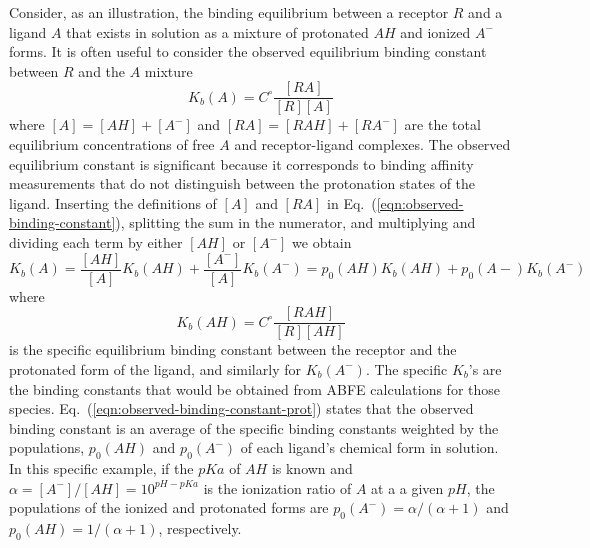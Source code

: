 \documentclass[9pt,bestpractices,pubversion]{livecoms}
\begin{document}
Consider, as an illustration, the binding equilibrium between a receptor $R$ and a ligand $A$ that exists in solution as a mixture of protonated $AH$ and ionized $A^-$ forms. It is often useful to consider the observed equilibrium binding constant between $R$ and the $A$ mixture 
\begin{equation}
  K_b(A) = C^\circ \frac{[RA]}{[R][A]}
  \label{eqn:observed-binding-constant}
\end{equation}
where $[A] = [AH] + [A^-]$ and $[RA] = [RAH] + [RA^-]$ are the total equilibrium concentrations of free $A$ and receptor-ligand complexes. The observed equilibrium constant is significant because it corresponds to binding affinity measurements that do not distinguish between the protonation states of the ligand. Inserting the definitions of $[A]$ and $[RA]$ in Eq.~(\ref{eqn:observed-binding-constant}), splitting the sum in the numerator, and multiplying and dividing each term by either $[AH]$ or $[A^-]$ we obtain
\begin{equation}
  K_b(A) = \frac{[AH]}{[A]}  K_b(AH) +  \frac{[A^-]}{[A]} K_b(A^-) =  p_0(AH) K_b(AH) +  p_0(A-) K_b(A^-)
  \label{eqn:observed-binding-constant-split}
\end{equation}
where
\begin{equation}
  K_b(AH) = C^\circ \frac{[RAH]}{[R][AH]}
  \label{eqn:observed-binding-constant-prot}
\end{equation}
is the specific equilibrium binding constant between the receptor and the protonated form of the ligand, and similarly for $K_b(A^-)$. The specific $K_b$'s are the binding constants that would be obtained from ABFE calculations for those species. Eq.~(\ref{eqn:observed-binding-constant-prot}) states that the observed binding constant is an average of the specific binding constants weighted by the populations, $p_0(AH)$ and  $p_0(A^-)$ of each ligand's chemical form in solution. In this specific example, if the $pKa$ of $AH$ is known and $\alpha = [A^-]/[AH] = 10^{pH-pKa} $ is the ionization ratio of $A$ at a a given $pH$, the populations of the ionized and protonated forms are $p_0(A^-) = \alpha/(\alpha+1)$ and $p_0(AH) = 1/(\alpha+1)$, respectively.\cite{champion2024multistate,azimi2022application}
\end{document}
